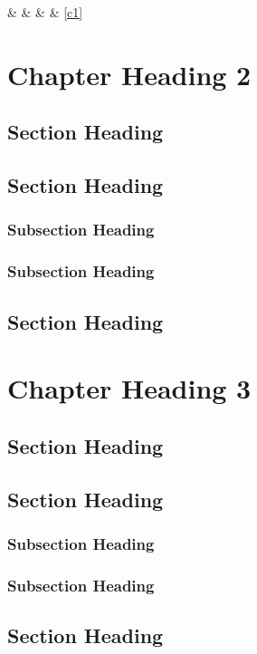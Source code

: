 \documentclass[dissertation]{aaltoseries}
\begin{document}
 \&  \&   \& \pageref{c1} \& \ref{c1} 


\chapter{Chapter Heading 2}
\section{Section Heading}
\lipsum[1-4]
\section{Section Heading}
\lipsum[5-6]
\subsection{Subsection Heading}
\lipsum[7-8]
\subsection{Subsection Heading}
\lipsum[9-10]
\section{Section Heading}
\lipsum[11-12]

\chapter[Short Chapter Heading]{Chapter Heading 3}
\section{Section Heading}
\lipsum[1-4]
\section{Section Heading}
\lipsum[5-6]
\subsection{Subsection Heading}
\lipsum[7-8]
\subsection{Subsection Heading}
\lipsum[9-10]
\section{Section Heading}
\lipsum[11-12]
\end{document}
